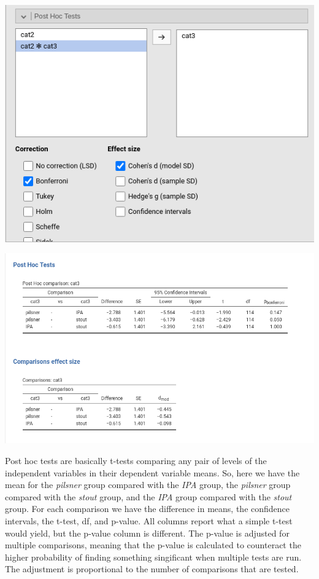 \documentclass[
]{book}
\begin{document}
\includegraphics[width=7.92in]{bookletpics/2_anova_input6}

\includegraphics[width=10.93in]{bookletpics/2_anova_output6}

Post hoc tests are basically t-tests comparing any pair of levels of the independent variables in their dependent variable means. So, here we have the mean for the \emph{pilsner} group compared with the \emph{IPA} group, the \emph{pilsner} group compared with the \emph{stout} group, and the \emph{IPA} group compared with the \emph{stout} group. For each comparison we have the difference in means, the confidence intervals, the t-test, df, and p-value. All columns report what a simple t-test would yield, but the p-value column is different. The p-value is adjusted for multiple comparisons, meaning that the p-value is calculated to counteract the higher probability of finding something singificant when multiple tests are run. The adjustment is proportional to the number of comparisons that are tested.
\end{document}
